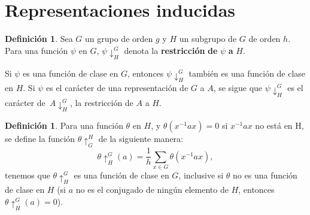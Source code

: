 \documentclass[12pt]{book}
\theoremstyle{definition}
\newtheorem{definition}[theorem]{Definición}
\newcounter{in}
\newcounter{ini}
\begin{document}
\section{Representaciones inducidas}
\label{sec:ri}
\begin{definition}
Sea $G$ un grupo de orden $g$ y $H$ un subgrupo de $G$ de orden
$h$. Para una función $\psi$ en $G$, $\psi\downarrow^{G}_{H}$ denota
la \textbf{restricción} \textbf{de} $\psi$ \textbf{a} $H$. 
\end{definition}
Si $\psi$ es una función de clase en $G$, entonces $\psi\downarrow^{G}_{H}$
también es una función de clase en $H$. Si $\psi$ es el carácter de
una representación de $G$ a $A$, se sigue que $\psi\downarrow^{G}_{H}$
es el carácter de~$A\downarrow^{G}_{H}$, la restricción de $A$ a $H$.
\begin{definition}
Para una función $\theta$ en $H$, y $\theta(x^{-1}ax)=0$ si $x^{-1}ax$
no está en H, se define la función $\theta \uparrow^{H}_{G}$ de la
siguiente manera:
\begin{equation}
  \label{eq:112}
  \theta\uparrow^{G}_{H}(a)=\frac{1}{h} \sum_{x \in G} \theta(x^{-1}ax),
\end{equation}
tenemos que $\theta\uparrow^{G}_{H}$ es una función de clase en $G$,
inclusive si $\theta$ no es una función de clase en $H$ (si $a$ no es el
conjugado de ningún elemento de $H$,
entonces~$\theta\uparrow^{G}_{H}(a)=0$).
\end{definition}
\end{document}
